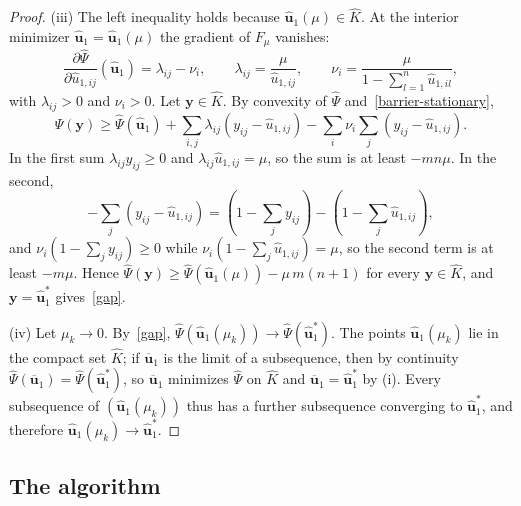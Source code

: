 \documentclass[11pt]{article}
\theoremstyle{plain}
\theoremstyle{definition}
\theoremstyle{remark}
\numberwithin{equation}{section}
\numberwithin{figure}{section}
\numberwithin{table}{section}
\begin{document}
\begin{proof}
(iii) The left inequality holds because $\widehat{\bm u}_1(\mu)\in\widehat K$. At the
interior minimizer $\widehat{\bm u}_1=\widehat{\bm u}_1(\mu)$ the gradient of
$F_\mu$ vanishes:
\begin{equation}\label{barrier-stationary}
\frac{\partial\widehat\Psi}{\partial\widehat u_{1,ij}}(\widehat{\bm u}_1)
=\lambda_{ij}-\nu_i,\qquad
\lambda_{ij}=\frac{\mu}{\widehat u_{1,ij}},\qquad
\nu_i=\frac{\mu}{1-\sum_{l=1}^{n}\widehat u_{1,il}} ,
\end{equation}
with $\lambda_{ij}>0$ and $\nu_i>0$. Let $\bm y\in\widehat K$. By convexity of
$\widehat\Psi$ and~\eqref{barrier-stationary},
\begin{equation}
\widehat\Psi(\bm y)\ge\widehat\Psi(\widehat{\bm u}_1)
+\sum_{i,j}\lambda_{ij}\left(y_{ij}-\widehat u_{1,ij}\right)
-\sum_{i}\nu_i\sum_{j}\left(y_{ij}-\widehat u_{1,ij}\right).
\end{equation}
In the first sum $\lambda_{ij}y_{ij}\ge 0$ and $\lambda_{ij}\widehat u_{1,ij}=\mu$,
so the sum is at least $-mn\mu$. In the second,
\begin{equation}
-\sum_j\left(y_{ij}-\widehat u_{1,ij}\right)
=\left(1-\sum_j y_{ij}\right)-\left(1-\sum_j\widehat u_{1,ij}\right),
\end{equation}
and $\nu_i\left(1-\sum_j y_{ij}\right)\ge 0$ while
$\nu_i\left(1-\sum_j\widehat u_{1,ij}\right)=\mu$, so the second term is at least
$-m\mu$. Hence $\widehat\Psi(\bm y)\ge\widehat\Psi(\widehat{\bm u}_1(\mu))-\mu\,m(n+1)$
for every $\bm y\in\widehat K$, and $\bm y=\widehat{\bm u}_1^*$ gives~\eqref{gap}.

(iv) Let $\mu_k\to 0$. By~\eqref{gap},
$\widehat\Psi\left(\widehat{\bm u}_1(\mu_k)\right)\to\widehat\Psi\left(\widehat{\bm u}_1^*\right)$.
The points $\widehat{\bm u}_1(\mu_k)$ lie in the compact set $\widehat K$; if
$\overline{\bm u}_1$ is the limit of a subsequence, then by continuity
$\widehat\Psi(\overline{\bm u}_1)=\widehat\Psi(\widehat{\bm u}_1^*)$, so
$\overline{\bm u}_1$ minimizes $\widehat\Psi$ on $\widehat K$ and $\overline{\bm u}_1=\widehat{\bm u}_1^*$
by (i). Every subsequence of $\left(\widehat{\bm u}_1(\mu_k)\right)$ thus has a
further subsequence converging to $\widehat{\bm u}_1^*$, and therefore
$\widehat{\bm u}_1(\mu_k)\to\widehat{\bm u}_1^*$.
\end{proof}

\subsection{The algorithm}\label{sec-algorithm}
\end{document}

